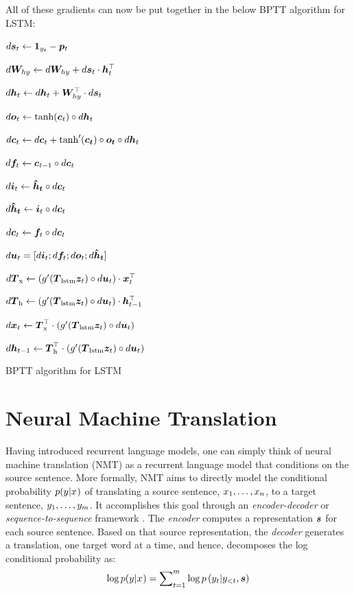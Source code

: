 All of these gradients can now be put together in the below BPTT algorithm for LSTM:
\begin{algorithm}
\label{a:lstm}
{
$d\bm{s}_{t} \leftarrow \bm{1}_{y_t} - \bm{p}_{t}$

$d\bm{W}_{hy} \leftarrow d\bm{W}_{hy} + d\bm{s}_{t} \cdot \bm{h}_{t}^\top$

$d\bm{h}_{t} \leftarrow d\bm{h}_{t} + \bm{W}_{hy}^\top \cdot d\bm{s}_{t}$

$d\bm{o}_{t} \leftarrow \tanh(\bm{c}_{t}) \circ d\bm{h}_{t}$

$d\bm{c}_{t} \leftarrow d\bm{c}_{t} + \tanh'(\bm{\bm{c}_{t}}) \circ \bm{\bm{o}_{t}} \circ d\bm{h}_{t}$ 

$d\bm{f}_{t} \leftarrow \bm{c}_{t-1} \circ d\bm{c}_{t}$

$d\bm{i}_{t} \leftarrow \mbox{\boldmath{$\hat{h}_t$}} \circ d\bm{c}_{t}$

$d\mbox{\boldmath{$\hat{h}_t$}} \leftarrow \bm{i}_{t} \circ d\bm{c}_{t}$

$d\bm{c}_{t} \leftarrow \bm{f}_{t} \circ d\bm{c}_{t}$ 

$d\bm{u}_t = [d\bm{i}_{t}; d\bm{f}_{t}; d\bm{o}_{t}; d\mbox{\boldmath{$\hat{h}_t$}}]$

$d\mbox{\boldmath{$T$}}_{\text{x}} \leftarrow \left(g'(\mbox{\boldmath{$T$}}_{\text{lstm}} \bm{z}_{t}) \circ d\bm{u}_t\right) \cdot \bm{x}_{t}^\top$

$d\mbox{\boldmath{$T$}}_{\text{h}} \leftarrow  \left(g'(\mbox{\boldmath{$T$}}_{\text{lstm}} \bm{z}_{t}) \circ d\bm{u}_t\right) \cdot \bm{h}_{t-1}^\top$

$d\bm{x}_{t} \leftarrow  \mbox{\boldmath{$T$}}_{\text{x}}^\top \cdot \left(g'(\mbox{\boldmath{$T$}}_{\text{lstm}} \bm{z}_{t}) \circ d\bm{u}_t\right)$

$d\bm{h}_{t-1} \leftarrow  \mbox{\boldmath{$T$}}_{\text{h}}^\top \cdot \left(g'(\mbox{\boldmath{$T$}}_{\text{lstm}} \bm{z}_{t}) \circ d\bm{u}_t\right)$
}
\caption{BPTT algorithm for LSTM}
\end{algorithm}

\section{Neural Machine Translation}
Having introduced recurrent language models, one can simply think of
neural machine translation (NMT) as a recurrent language model that conditions
on the source sentence. More formally, NMT aims to directly model the
conditional probability $p(y_{}|x_{})$ of translating
a source sentence, $x_{1},\ldots,x_{n}$, to a target sentence, $y_{1},\ldots,y_{m}$.
It accomplishes this goal through an {\it encoder-decoder} or {\it
sequence-to-sequence} framework
\cite{kal13,sutskever14,cho14}. The {\it encoder} computes a representation $\mbox{\boldmath{$s$}}$
for each source sentence. Based on that source representation,
the {\it decoder} generates a translation, one target word at a time, and hence,
decomposes the log conditional probability as:
\begin{equation}
\log p(y_{}|x_{}) = \sum_{t=1}^m \nolimits \log
p\left(y_{t}|y_{<t},\mbox{\boldmath{$s$}}\right)
\label{e:s2s}
\end{equation}

